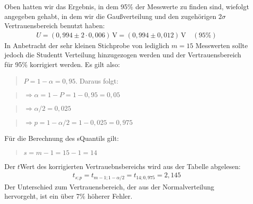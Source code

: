 \documentclass[letterpaper,10pt,english]{jupyterBook}
\begin{document}
\sphinxAtStartPar
Oben hatten wir das Ergebnis, in dem 95\% der Messwerte zu finden sind, wiefolgt angegeben gehabt, in dem wir die Gaußverteilung und den zugehörigen \(2\sigma\)\sphinxhyphen{}Vertrauensbereich benutzt haben:
\begin{equation*}
\begin{split}U = (0,994 \pm 2\cdot 0,006)\,\mathrm V = (0,994 \pm 0,012)\,\mathrm V \quad (95\%)\end{split}
\end{equation*}
\sphinxAtStartPar
In Anbetracht der sehr kleinen Stichprobe von lediglich \(m=15\) Messwerten sollte jedoch die Student\sphinxhyphen{}t Verteilung hinzugezogen werden und der Vertrauensbereich für 95\% korrigiert werden. Es gilt also:
\begin{quote}

\sphinxAtStartPar
\(P = 1-\alpha = 0,95\). Daraus folgt:
\end{quote}
\begin{quote}

\sphinxAtStartPar
\(\Rightarrow \alpha = 1-P = 1-0,95 = 0,05\)
\end{quote}
\begin{quote}

\sphinxAtStartPar
\(\Rightarrow \alpha/2 = 0,025\)
\end{quote}
\begin{quote}

\sphinxAtStartPar
\(\Rightarrow p = 1-\alpha/2 = 1-0,025 = 0,975\)
\end{quote}

\sphinxAtStartPar
Für die Berechnung des s\sphinxhyphen{}Quantils gilt:
\begin{quote}

\sphinxAtStartPar
\(s = m-1 = 15-1 = 14\)
\end{quote}

\sphinxAtStartPar
Der \(t\)\sphinxhyphen{}Wert des korrigierten Vertrauebnsbereichs wird aus der Tabelle abgelesen:
\begin{equation*}
\begin{split}t_{s;p} = t_{m-1; 1-\alpha/2} = t_{14; 0,975} = 2,145\end{split}
\end{equation*}
\sphinxAtStartPar
Der Unterschied zum Vertrauensbereich, der aus der Normalverteilung hervorgeht, ist ein über 7\% höherer Fehler.
\end{document}
